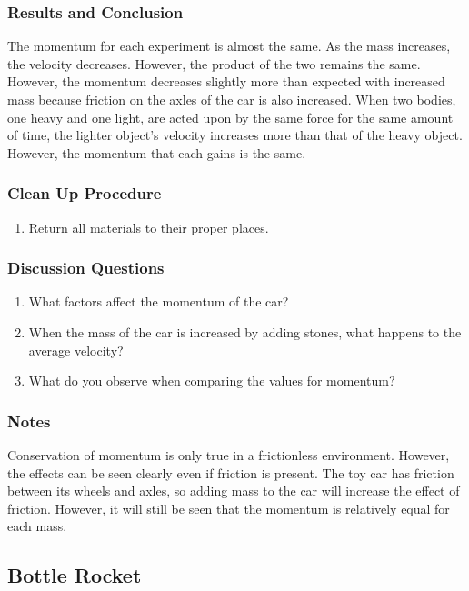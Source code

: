 \subsubsection*{Results and Conclusion}
The momentum for each experiment is almost the same.  As the mass increases, the velocity decreases.  However, the product of the two remains the same.  However, the momentum decreases slightly more than expected with increased mass because friction on the axles of the car is also increased.
When two bodies, one heavy and one light, are acted upon by the same force for the same amount of time, the lighter object's velocity increases more than that of the heavy object.  However, the momentum that each gains is the same.

\subsubsection*{Clean Up Procedure}
\begin{enumerate}
\item{Return all materials to their proper places.}
\end{enumerate}

\subsubsection*{Discussion Questions}
\begin{enumerate}
\item{What factors affect the momentum of the car?}
\item{When the mass of the car is increased by adding stones, what happens to the average velocity?}
\item{What do you observe when comparing the values for momentum?}
\end{enumerate}

\subsubsection*{Notes}
Conservation of momentum is only true in a frictionless environment.  However, the effects can be seen clearly even if friction is present.  The toy car has friction between its wheels and axles, so adding mass to the car will increase the effect of friction.  However, it will still be seen that the momentum is relatively equal for each mass.

\subsection{Bottle Rocket}

